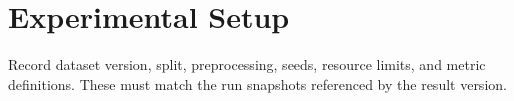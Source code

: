 \section{Experimental Setup}
\label{sec:experiments}
Record dataset version, split, preprocessing, seeds, resource limits, and metric definitions. These
must match the run snapshots referenced by the result version.
